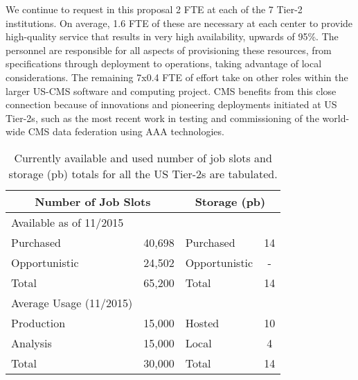 \documentclass[11pt,a4paper]{article}
\begin{document}
We continue to request in this proposal 2 FTE at each of the 7 Tier-2 institutions.
On average, 1.6 FTE of these are necessary at each center to provide high-quality service that results in 
very high availability, upwards of 95\%. The personnel are responsible
for all aspects of provisioning these resources, from specifications through
deployment to operations, taking advantage of local considerations. 
The remaining 7x0.4 FTE of effort take 
on other roles within the larger US-CMS software and computing project.  
CMS benefits from this close connection because of innovations and pioneering deployments initiated at US Tier-2s, such as
the most recent work in testing and commissioning of the world-wide
CMS data federation using AAA technologies.

\begin{table}
\begin{center}
\begin{tabular}{|l|c|l|c|}
\hline
\multicolumn{2}{|c|}{Number of Job Slots} &  \multicolumn{2}{|c|}{Storage (pb)} \\ \hline
Available as of 11/2015 &          &               &    \\
Purchased     & 40,698             & Purchased     & 14 \\
Opportunistic & 24,502             & Opportunistic & -  \\
Total         & 65,200             & Total         & 14 \\ \hline
Average Usage (11/2015) &          &               &    \\
Production    & 15,000             & Hosted        & 10 \\
Analysis      & 15,000             & Local         &  4 \\
Total         & 30,000             & Total         & 14 \\ \hline
\end{tabular}
\caption[]
{
Currently available and used number of job slots and storage (pb) totals for all the US Tier-2s are tabulated.
}
\label{current-resources}
\end{center}
\end{table}
\end{document}
